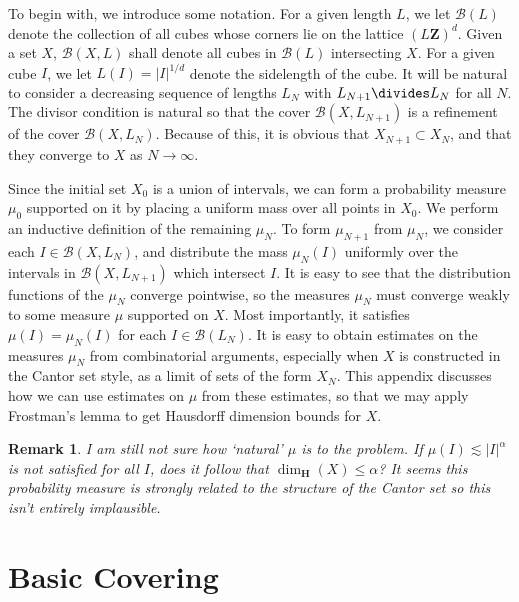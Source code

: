 \documentclass{report}
\theoremstyle{plain}
\theoremstyle{plain}
\newtheorem*{remark}{Remark}
\begin{document}
To begin with, we introduce some notation. For a given length $L$, we let $\mathcal{B}(L)$ denote the collection of all cubes whose corners lie on the lattice $(L \mathbf{Z})^d$. Given a set $X$, $\mathcal{B}(X,L)$ shall denote all cubes in $\mathcal{B}(L)$ intersecting $X$. For a given cube $I$, we let $L(I) = |I|^{1/d}$ denote the sidelength of the cube. It will be natural to consider a decreasing sequence of lengths $L_N$ with $L_{N+1} \divides L_N$ for all $N$. The divisor condition is natural so that the cover $\mathcal{B}(X,L_{N+1})$ is a refinement of the cover $\mathcal{B}(X,L_N)$. Because of this, it is obvious that $X_{N+1} \subset X_N$, and that they converge to $X$ as $N \to \infty$.

Since the initial set $X_0$ is a union of intervals, we can form a probability measure $\mu_0$ supported on it by placing a uniform mass over all points in $X_0$. We perform an inductive definition of the remaining $\mu_N$. To form $\mu_{N+1}$ from $\mu_N$, we consider each $I \in \mathcal{B}(X,L_N)$, and distribute the mass $\mu_N(I)$ uniformly over the intervals in $\mathcal{B}(X,L_{N+1})$ which intersect $I$. It is easy to see that the distribution functions of the $\mu_N$ converge pointwise, so the measures $\mu_N$ must converge weakly to some measure $\mu$ supported on $X$. Most importantly, it satisfies $\mu(I) = \mu_N(I)$ for each $I \in \mathcal{B}(L_N)$. It is easy to obtain estimates on the measures $\mu_N$ from combinatorial arguments, especially when $X$ is constructed in the Cantor set style, as a limit of sets of the form $X_N$. This appendix discusses how we can use estimates on $\mu$ from these estimates, so that we may apply Frostman's lemma to get Hausdorff dimension bounds for $X$.

\begin{remark}
    I am still not sure how `natural' $\mu$ is to the problem. If $\mu(I) \lesssim |I|^\alpha$ is {\it not} satisfied for all $I$, does it follow that $\dim_{\mathbf{H}}(X) \leq \alpha$? It seems this probability measure is strongly related to the structure of the Cantor set so this isn't entirely implausible.
\end{remark}

\section{Basic Covering}
\end{document}
